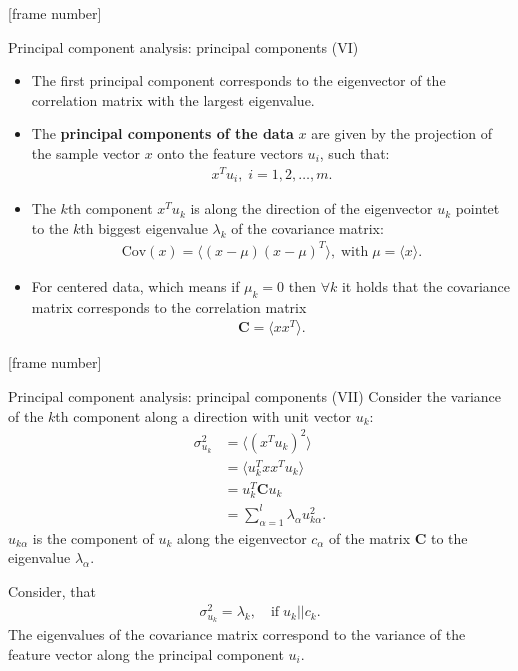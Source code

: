 \documentclass[aspectratio=169,t]{beamer}
\begin{document}
  {
    [frame number]
    \begin{frame}{Principal component analysis: principal components (VI)}
    \begin{itemize}
      \item The first principal component corresponds to the eigenvector of the correlation matrix with the largest eigenvalue.
      \item The \textbf{\color{airforceblue}principal components of the data} $x$ are given by the projection of the sample vector $x$ onto the feature vectors $u_i$, such that:
      \begin{align}
        x^Tu_i, \; i = 1, 2, \ldots, m.
      \end{align}
      \item The $k$th component $x^Tu_k$ is along the direction of the eigenvector $u_k$ pointet to the $k$th biggest eigenvalue $\lambda_k$ of the covariance matrix:
      \begin{align}
        \text{Cov}(x) = \langle (x-\mu) (x-\mu)^T \rangle, \; \text{with} \; \mu = \langle x \rangle.
      \end{align}
      \item For centered data, which means if $\mu_k = 0$ then $\forall k$ it holds that the covariance matrix corresponds to the correlation matrix
      \begin{align}
        \mathbf{C} = \langle xx^T \rangle.
      \end{align}
    \end{itemize}
    \end{frame}
  }

  {
    [frame number]
    \begin{frame}{Principal component analysis: principal components (VII)}
    Consider the variance of the $k$th component along a direction with unit vector $u_k$:
    \begin{align}
      \sigma_{u_k}^2 &= \langle (x^Tu_k)^2 \rangle\\
                     &= \langle u_k^T xx^T u_k \rangle\\
                     &= u_k^T \mathbf{C} u_k\\
                     &= \sum_{\alpha = 1}^{l}\lambda_{\alpha}u_{k\alpha}^2.
    \end{align}
    $u_{k\alpha}$ is the component of $u_k$ along the eigenvector $c_\alpha$ of the matrix $\mathbf{C}$ to the eigenvalue $\lambda_\alpha$.

    Consider, that
    \begin{align}
      \sigma_{u_k}^{2} = \lambda_k, \quad \text{if} \; u_k \vert \vert c_k.
    \end{align}
    The eigenvalues of the covariance matrix correspond to the variance of the feature vector along the principal component $u_i$.
    \end{frame}
  }
\end{document}
